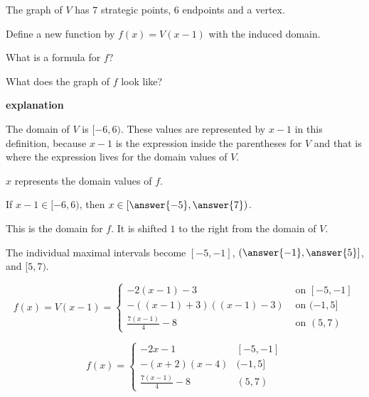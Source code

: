 \documentclass{ximera}
\begin{document}
\begin{example}
The graph of $V$ has $7$ strategic points, $6$ endpoints and a vertex.








Define a new function by $f(x) = V(x-1)$ with the induced domain.




What is a formula for $f$?

What does the graph of $f$ look like?



\textbf{\textcolor{red!75!green}{explanation}} 


The domain of $V$ is $[-6, 6)$.  These values are represented by $x-1$ in this definition, because $x-1$ is the expression inside the parentheses for $V$ and that is where the expression lives for the domain values of $V$.

$x$ represents the domain values of $f$.   

If $x - 1 \in [-6, 6)$, then $x \in \left[\answer{-5}, \answer{7}\right)$.  

This is the domain for $f$.  It is shifted $1$ to the right from the domain of $V$.  

The individual maximal intervals become $[-5, -1]$, $\left(\answer{-1}, \answer{5}\right]$, and $[5, 7)$.





\[
f(x) = V(x-1) = 
\begin{cases}
  -2(x-1)-3 & \text{ on } [-5, -1]   \\
  -((x-1)+3)((x-1)-3) & \text{ on } (-1, 5]  \\
  \frac{7(x-1)}{4} - 8 & \text{ on } (5, 7)
\end{cases}
\]





\[
f(x) = 
\begin{cases}
  -2x - 1 &  [-5, -1]   \\
  -(x+2)(x-4) &  (-1, 5]  \\
  \frac{7(x-1)}{4} - 8 &  (5, 7)
\end{cases}
\]


















\end{example}
\end{document}

